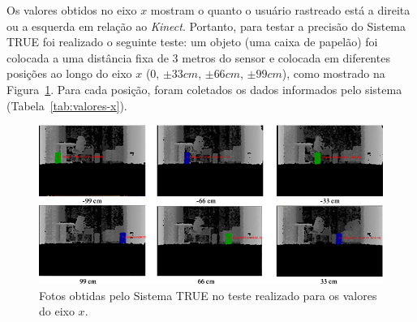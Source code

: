 	Os valores obtidos no eixo $\displaystyle x$ mostram o quanto o usuário
	rastreado está a direita ou a esquerda em relação ao \textit{Kinect}. Portanto,
	para testar a precisão do Sistema TRUE foi realizado o seguinte teste: um objeto
	(uma caixa de papelão) foi colocada a uma distância fixa de 3 metros do sensor e
	colocada em diferentes posições ao longo do eixo $\displaystyle x$ (0,
	$\displaystyle \pm33 cm$, $\displaystyle \pm66 cm$, $\displaystyle \pm99 cm$),
	como mostrado na Figura~\ref{fig:eixox-imgs}. Para cada posição, foram coletados
	os dados informados pelo sistema (Tabela~\ref{tab:valores-x}).


	\begin{figure}[htb]
		\begin{center}
			\includegraphics[scale=0.5]{figuras/5.Testes/eixox-imgs2.png}
		\end{center}
		\caption{Fotos obtidas pelo Sistema TRUE no teste realizado para os valores do eixo $\displaystyle x$.}
		\label{fig:eixox-imgs}
	\end{figure}

